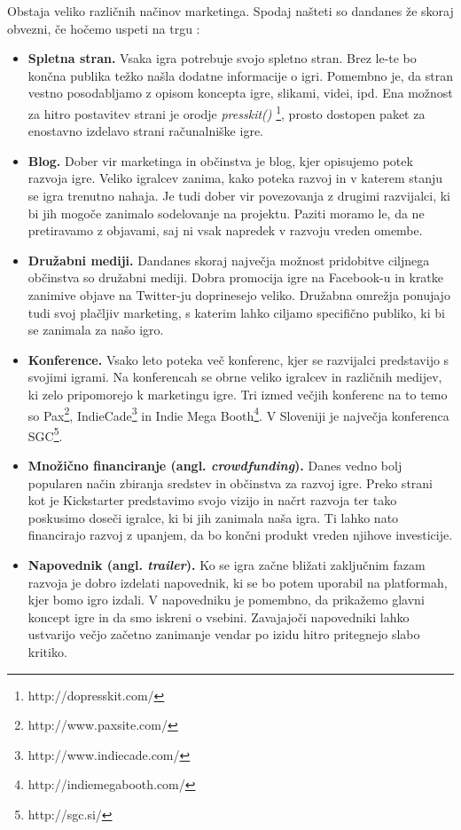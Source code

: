 \documentclass[12pt,a4paper,twoside]{book}
\begin{document}
Obstaja veliko različnih načinov marketinga. Spodaj našteti so dandanes že skoraj obvezni, če hočemo uspeti na trgu \cite{robertMarketing}:
\begin{itemize}
	\item \textbf{Spletna stran.} Vsaka igra potrebuje svojo spletno stran. Brez le-te bo končna publika težko našla dodatne informacije o igri. Pomembno je, da stran vestno posodabljamo z opisom koncepta igre, slikami, videi, ipd. Ena možnost za hitro postavitev strani je orodje \textit{presskit()} \footnote{http://dopresskit.com/}, prosto dostopen paket za enostavno izdelavo strani računalniške igre.
	\item \textbf{Blog.} Dober vir marketinga in občinstva je blog, kjer opisujemo potek razvoja igre. Veliko igralcev zanima, kako poteka razvoj in v katerem stanju se igra trenutno nahaja. Je tudi dober vir povezovanja z drugimi razvijalci, ki bi jih mogoče zanimalo sodelovanje na projektu. Paziti moramo le, da ne pretiravamo z objavami, saj ni vsak napredek v razvoju vreden omembe.
	\item \textbf{Družabni mediji.} Dandanes skoraj največja možnost pridobitve ciljnega občinstva so družabni mediji. Dobra promocija igre na Facebook-u in kratke zanimive objave na Twitter-ju doprinesejo veliko. Družabna omrežja ponujajo tudi svoj plačljiv marketing, s katerim lahko ciljamo specifično publiko, ki bi se zanimala za našo igro.
	\item \textbf{Konference.} Vsako leto poteka več konferenc, kjer se razvijalci predstavijo s svojimi igrami. Na konferencah	se obrne veliko igralcev in različnih medijev, ki zelo pripomorejo k marketingu igre. Tri izmed večjih konferenc na to temo so Pax\footnote{http://www.paxsite.com/}, IndieCade\footnote{http://www.indiecade.com/} in Indie Mega Booth\footnote{http://indiemegabooth.com/}. V Sloveniji je največja konferenca SGC\footnote{http://sgc.si/}.
	\item \textbf{Množično financiranje (angl. \textit{crowdfunding}).} Danes vedno bolj popularen način zbiranja sredstev in občinstva za razvoj igre. Preko strani kot je Kickstarter predstavimo svojo vizijo in načrt razvoja ter tako poskusimo doseči igralce, ki bi jih zanimala naša igra. Ti lahko nato financirajo razvoj z upanjem, da bo končni produkt  vreden njihove investicije.
	\item \textbf{Napovednik (angl. \textit{trailer}).} Ko se igra začne bližati zaključnim fazam razvoja je dobro izdelati napovednik, ki se bo potem uporabil na platformah, kjer bomo igro izdali. V napovedniku je pomembno, da prikažemo glavni koncept igre in da smo iskreni o vsebini. Zavajajoči napovedniki lahko ustvarijo večjo začetno zanimanje vendar po izidu hitro pritegnejo slabo kritiko.
\end{itemize}
\end{document}
